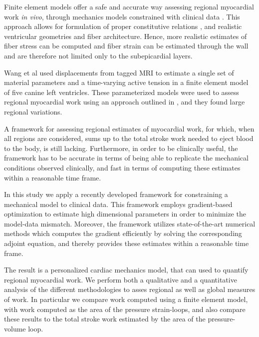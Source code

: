 Finite element models offer a safe and accurate way assessing
regional myocardial work {\it in vivo}, through mechanics models
constrained with clinical data \cite{balaban2017high}. This approach
allows for formulation of proper constitutive relations
\cite{holzapfel2009constitutive}, and realistic ventricular geometries
and fiber architecture. Hence, more realistic estimates of fiber
stress can be computed and fiber strain can be estimated through the
wall and are therefore not limited only to the subepicardial layers. 



Wang et al \cite{wang2011myocardial} used displacements from
tagged MRI to estimate a single set of material parameters and a
time-varying active tension in a finite element model of five
canine left ventricles. These parameterized models were used to assess
regional myocardial work using an approach outlined in
\cite{niederer2009role}, and they found large regional variations.

A framework for assessing regional estimates of myocardial
work, for which, when all regions are considered, sums up to the total
stroke work needed to eject blood to the body, is still
lacking. Furthermore, in order to be clinically useful, the framework
has to be accurate in terms of being able to replicate the mechanical
conditions observed clinically, and fast in terms of computing these
estimates within a reasonable time frame.

In this study we apply a recently developed framework
\cite{balaban2017high} for constraining a mechanical model to clinical
data. This framework employs gradient-based optimization to estimate high
dimensional parameters in order to minimize the model-data
mismatch. Moreover, the framework utilizes state-of-the-art numerical
methods which computes the gradient efficiently by solving the
corresponding adjoint equation, and thereby provides these estimates
within a reasonable time frame.  

The result is a personalized cardiac mechanics model, that can used to quantify
regional myocardial work. We perform both a qualitative and a
quantitative analysis of the different methodologies to asses regional
as well as global measures of work. In particular we compare work
computed using a finite element model, with work computed as the area
of the pressure strain-loops, and also compare these results
to the total stroke work estimated by the area of the
pressure-volume loop.



